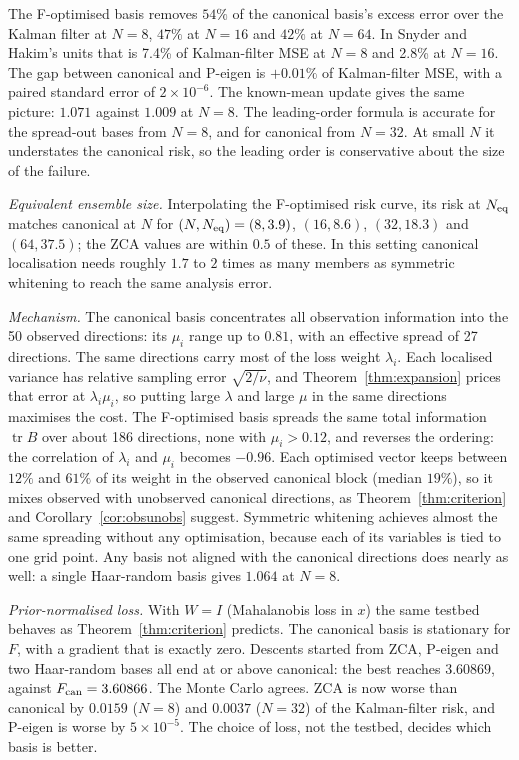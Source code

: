 \documentclass[11pt,a4paper]{article}
\numberwithin{equation}{section}
\theoremstyle{remark}\newtheorem{remark}[theorem]{Remark}
\newcommand{\tr}{\operatorname{tr}}
\begin{document}
The F-optimised basis removes \(54\%\) of the canonical basis's excess error over the Kalman
filter at \(N=8\), \(47\%\) at \(N=16\) and \(42\%\) at \(N=64\). In Snyder and Hakim's units that is
7.4\% of Kalman-filter MSE at \(N=8\) and 2.8\% at \(N=16\). The gap between canonical and P-eigen
is \(+0.01\%\) of Kalman-filter MSE, with a paired standard error of \(2\times10^{-6}\). The
known-mean update gives the same picture: \(1.071\) against \(1.009\) at \(N=8\). The leading-order
formula is accurate for the spread-out bases from \(N=8\), and for canonical from \(N=32\). At small
\(N\) it understates the canonical risk, so the leading order is conservative about the size of the
failure.

\emph{Equivalent ensemble size.} Interpolating the F-optimised risk curve, its risk at
\(N_{\rm eq}\) matches canonical at \(N\) for \((N,N_{\rm eq})=(8,3.9)\), \((16,8.6)\), \((32,18.3)\)
and \((64,37.5)\); the ZCA values are within \(0.5\) of these. In this setting canonical
localisation needs roughly \(1.7\) to \(2\) times as many members as symmetric whitening to reach
the same analysis error.

\emph{Mechanism.} The canonical basis concentrates all observation information into the 50
observed directions: its \(\mu_i\) range up to \(0.81\), with an effective spread of 27 directions.
The same directions carry most of the loss weight \(\lambda_i\). Each localised variance has
relative sampling error \(\sqrt{2/\nu}\), and Theorem~\ref{thm:expansion} prices that error at
\(\lambda_i\mu_i\), so putting large \(\lambda\) and large \(\mu\) in the same directions maximises
the cost. The F-optimised basis spreads the same total information \(\tr B\) over about 186
directions, none with \(\mu_i>0.12\), and reverses the ordering: the correlation of \(\lambda_i\)
and \(\mu_i\) becomes \(-0.96\). Each optimised vector keeps between \(12\%\) and \(61\%\) of its weight
in the observed canonical block (median \(19\%\)), so it mixes observed with unobserved canonical
directions, as Theorem~\ref{thm:criterion} and Corollary~\ref{cor:obsunobs} suggest. Symmetric
whitening achieves almost the same spreading without any optimisation, because each of its
variables is tied to one grid point. Any basis not aligned with the canonical directions does
nearly as well: a single Haar-random basis gives \(1.064\) at \(N=8\).

\emph{Prior-normalised loss.} With \(W=I\) (Mahalanobis loss in \(x\)) the same testbed behaves as
Theorem~\ref{thm:criterion} predicts. The canonical basis is stationary for \(F\), with a gradient
that is exactly zero. Descents started from ZCA, P-eigen and two Haar-random bases all end at or
above canonical: the best reaches \(3.60869\), against \(F_{\rm can}=3.60866\). The Monte Carlo
agrees. ZCA is now worse than canonical by \(0.0159\) (\(N=8\)) and \(0.0037\) (\(N=32\)) of the
Kalman-filter risk, and P-eigen is worse by \(5\times10^{-5}\). The choice of loss, not the
testbed, decides which basis is better.
\end{document}
